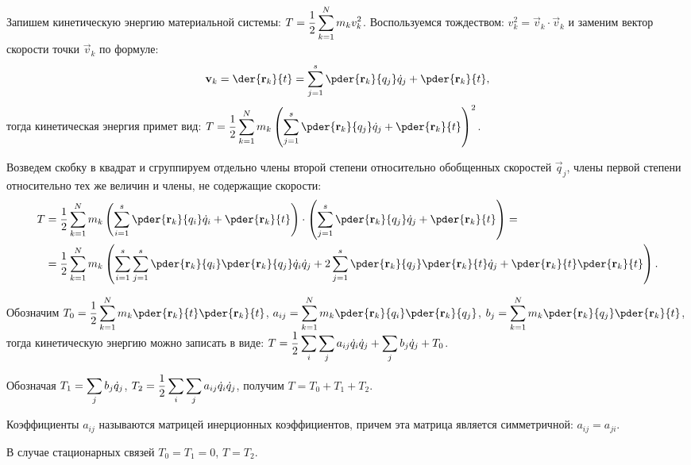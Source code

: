 
Запишем кинетическую энергию материальной системы:
\( \displaystyle T = \frac{1}{2}\sum_{k=1}^N m_k v_k^2 \). Воспользуемся тождеством:
\( v_k^2 = \vec{v}_k\cdot\vec{v}_k \) и заменим вектор скорости точки
\( \vec{v}_k \) по формуле:
\[
    \vec{v}_k =\der{\vec{r}_k}{t} = \sum_{j=1}^s \pder{\vec{r}_k}{q_j}\dot{q}_j
    + \pder{\vec{r}_k}{t},
\]
тогда кинетическая энергия примет вид: \( \ds T = \frac{1}{2}\sum_{k=1}^N m_k
\left(\sum_{j=1}^s \pder{\vec{r}_k}{q_j}\dot{q}_j +
\pder{\vec{r}_k}{t}\right)^2 \).

Возведем скобку в квадрат и сгруппируем отдельно члены второй степени
относительно обобщенных скоростей \( \vec{q}_j \), члены первой степени
относительно тех же величин и члены, не содержащие скорости:
\begin{align*}
    T & = \frac{1}{2} \sum_{k=1}^N m_k\left( \sum_{i=1}^s \pder{\vec{r}_k}{q_i}
    \dot{q}_i + \pder{\vec{r}_k}{t} \right) \cdot \left( \sum_{j=1}^s
    \pder{\vec{r}_k}{q_j}\dot{q}_j + \pder{\vec{r}_k}{t} \right) = \\
    & =\frac{1}{2}\sum_{k=1}^N m_k\left( \sum_{i=1}^s\sum_{j=1}^s
    \pder{\vec{r}_k}{q_i}\pder{\vec{r}_k}{q_j}\dot{q}_i\dot{q}_j + 2\sum_{j=1}^s
    \pder{\vec{r}_k}{q_j}\pder{\vec{r}_k}{t}\dot{q}_j + \pder{\vec{r}_k}{t}
    \pder{\vec{r}_k}{t}\right).
\end{align*}

Обозначим \( \ds T_0 = \frac{1}{2}\sum_{k=1}^N m_k\pder{\vec{r}_k}{t}
\pder{\vec{r}_k}{t} \), \( \ds a_{ij} = \sum_{k=1}^N m_k \pder{\vec{r}_k}{q_i}
\pder{\vec{r}_k}{q_j} \), \( \ds b_j = \sum_{k=1}^N m_k \pder{\vec{r}_k}{q_j}
\pder{\vec{r}_k}{t} \), тогда кинетическую энергию можно записать в виде:
\( \displaystyle T = \frac{1}{2} \sum_i\sum_j a_{ij}\dot{q}_i\dot{q}_j +
\sum_j b_j\dot{q}_j + T_0 \).

Обозначая \( \displaystyle T_1 = \sum_j b_j\dot{q}_j \),
\( \displaystyle T_2 = \frac{1}{2} \sum_i\sum_j a_{ij}\dot{q}_i\dot{q}_j \), получим
\( T = T_0 + T_1 + T_2 \).

Коэффициенты \( a_{ij} \) называются матрицей инерционных коэффициентов, причем
эта матрица является симметричной: \( a_{ij} = a_{ji} \).

В случае стационарных связей \( T_0 = T_1 = 0 \), \( T = T_2 \).


\newpage
